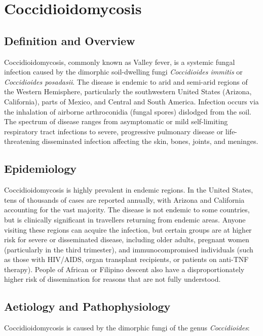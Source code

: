 \chapter{Coccidioidomycosis}

\section*{Definition and Overview}
Coccidioidomycosis, commonly known as Valley fever, is a systemic fungal infection caused by the dimorphic soil-dwelling fungi \textit{Coccidioides immitis} or \textit{Coccidioides posadasii}. The disease is endemic to arid and semi-arid regions of the Western Hemisphere, particularly the southwestern United States (Arizona, California), parts of Mexico, and Central and South America. Infection occurs via the inhalation of airborne arthroconidia (fungal spores) dislodged from the soil. The spectrum of disease ranges from asymptomatic or mild self-limiting respiratory tract infections to severe, progressive pulmonary disease or life-threatening disseminated infection affecting the skin, bones, joints, and meninges.

\section*{Epidemiology}
Coccidioidomycosis is highly prevalent in endemic regions. In the United States, tens of thousands of cases are reported annually, with Arizona and California accounting for the vast majority. The disease is not endemic to some countries, but is clinically significant in travellers returning from endemic areas. Anyone visiting these regions can acquire the infection, but certain groups are at higher risk for severe or disseminated disease, including older adults, pregnant women (particularly in the third trimester), and immunocompromised individuals (such as those with HIV/AIDS, organ transplant recipients, or patients on anti-TNF therapy). People of African or Filipino descent also have a disproportionately higher risk of dissemination for reasons that are not fully understood.

\section*{Aetiology and Pathophysiology}
Coccidioidomycosis is caused by the dimorphic fungi of the genus \textit{Coccidioides}:

